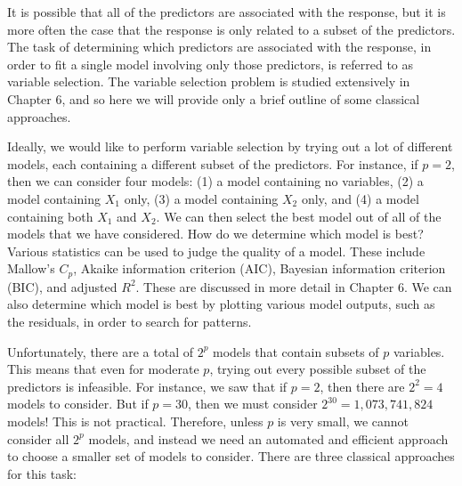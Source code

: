 \documentclass[10pt]{article}
\begin{document}
It is possible that all of the predictors are associated with the response, but it is more often the case that the response is only related to a subset of the predictors. The task of determining which predictors are associated with the response, in order to fit a single model involving only those predictors, is referred to as variable selection. The variable selection problem is studied extensively in Chapter 6, and so here we will provide only a brief outline of some classical approaches.

Ideally, we would like to perform variable selection by trying out a lot of different models, each containing a different subset of the predictors. For instance, if $p=2$, then we can consider four models: (1) a model containing no variables, (2) a model containing $X_{1}$ only, (3) a model containing $X_{2}$ only, and (4) a model containing both $X_{1}$ and $X_{2}$. We can then select the best model out of all of the models that we have considered. How do we determine which model is best? Various statistics can be used to judge the quality of a model. These include Mallow's $C_{p}$, Akaike information criterion (AIC), Bayesian information criterion (BIC), and adjusted $R^{2}$. These are discussed in more detail in Chapter 6. We can also determine which model is best by plotting various model outputs, such as the residuals, in order to search for patterns.

Unfortunately, there are a total of $2^{p}$ models that contain subsets of $p$ variables. This means that even for moderate $p$, trying out every possible subset of the predictors is infeasible. For instance, we saw that if $p=2$, then there are $2^{2}=4$ models to consider. But if $p=30$, then we must consider $2^{30}=1,073,741,824$ models! This is not practical. Therefore, unless $p$ is very small, we cannot consider all $2^{p}$ models, and instead we need an automated and efficient approach to choose a smaller set of models to consider. There are three classical approaches for this task:
\end{document}
